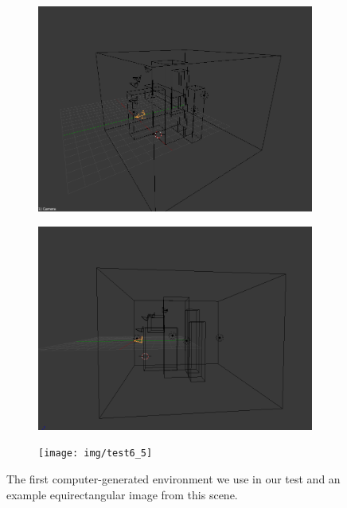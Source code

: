 \begin{figure}
\begin{subfigure}{0.4\textwidth}
	\end{subfigure}
	\begin{subfigure}{0.4\textwidth}
		\centering
		\includegraphics[width=\textwidth]{img/test6_3}
	\end{subfigure}
	\begin{subfigure}{0.4\textwidth}
		\centering
		\includegraphics[width=\textwidth]{img/test6_4}
	\end{subfigure}
	\begin{subfigure}{0.8\textwidth}
		\centering
		\texttt{[image: img/test6\_5]}
	\end{subfigure}
	\caption{The first computer-generated environment we use in our test and
	an example equirectangular image from this scene.}
    \label{fig:test6}
\end{figure}
%

